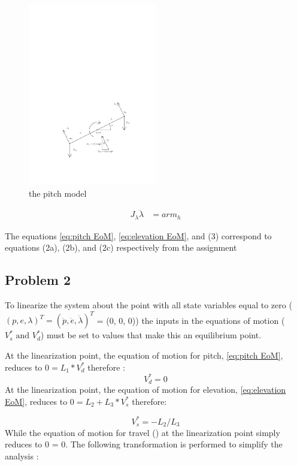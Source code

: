 \begin{figure}[H]
  \caption{the pitch model}
  \label{fig:pitch_model}
  \includegraphics[width=0.5\textwidth]{images/pitch_model}
\end{figure}

\begin{align*}
  \label{eq:lambda EoM}
  J_\lambda\ddot{\lambda} &= arm_h
\end{align*}

The equations \cref{eq:pitch EoM}, \ref{eq:elevation EoM}, and (3)
correspond to equations (2a), (2b), and (2c) respectively from the
assignment \cite[p.13]{assignment}

\subsection{Problem 2}
To linearize the system about the point with all state variables equal
to zero ($(p, e, \lambda)^T = (\dot{p},\dot{e},\dot{\lambda})^T $ = (0, 0, 0))
the inputs in the equations of motion ($V^{*}_{s} \text{ and } V^{*}_{d}$) must be set to
values that make this an equilibrium point.

At the linearization point, the equation of motion for pitch,
\cref{eq:pitch EoM}, reduces to $0 = L_{1} *
V^{*}_{d}$ therefore
:
\begin{equation}
  \label{eq:V^*_d value}
  V^{*}_{d} = 0
\end{equation}
At the linearization point, the equation of motion for elevation,
\cref{eq:elevation EoM}, reduces to $0 = L_{2} +
L_{3}*V^{*}_{s}$ therefore:

\begin{equation}
  \label{eq:V^*_s value}
  V^{*}_{s} = -L_{2} / L_{3}
\end{equation}
While the equation of motion for travel () at the linearization point simply reduces to 0 = 0.
The following transformation is performed to simplify the analysis
\cite[p.14]{assignment}:

